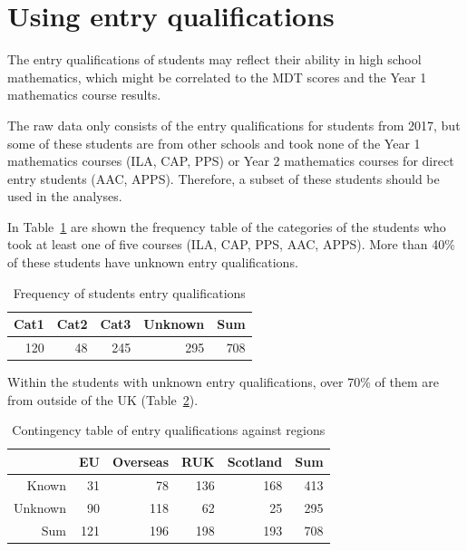 \documentclass[a4paper]{report}
\begin{document}
\section{Using entry qualifications}

The entry qualifications of students may reflect their ability in high school mathematics, which might be correlated to the MDT scores and the Year 1 mathematics course results. 

The raw data only consists of the entry qualifications for students from 2017, but some of these students are from other schools and took none of the Year 1 mathematics courses (ILA, CAP, PPS) or Year 2 mathematics courses for direct entry students (AAC, APPS). Therefore, a subset of these students should be used in the analyses. 

In Table~\ref{tab:REL_freq_qual} are shown the frequency table of the categories of the students who took at least one of five courses (ILA, CAP, PPS, AAC, APPS). More than 40\% of these students have unknown entry qualifications. 

\begin{table}[ht]
  \centering
  \begin{tabular}{rrrr|r}
    \hline
  Cat1 & Cat2 & Cat3 & Unknown & Sum \\ 
    \hline
  120 & 48 & 245 & 295 & 708 \\ 
     \hline
  \end{tabular}
  \caption{\label{tab:REL_freq_qual}Frequency of students entry qualifications}
\end{table}

Within the students with unknown entry qualifications, over 70\% of them are from outside of the UK (Table~\ref{tab:REL_freq_qual_vs_region}). 

\begin{table}[ht]
  \centering
  \begin{tabular}{r|rrrr|r}
    \hline
   & EU & Overseas & RUK & Scotland & Sum \\ 
    \hline
  Known & 31 & 78 & 136 & 168 & 413 \\ 
    Unknown & 90 & 118 & 62 & 25 & 295 \\ 
    \hline
    Sum & 121 & 196 & 198 & 193 & 708 \\ 
     \hline
  \end{tabular}
  \caption{\label{tab:REL_freq_qual_vs_region}Contingency table of entry qualifications against regions}
\end{table}
\end{document}
